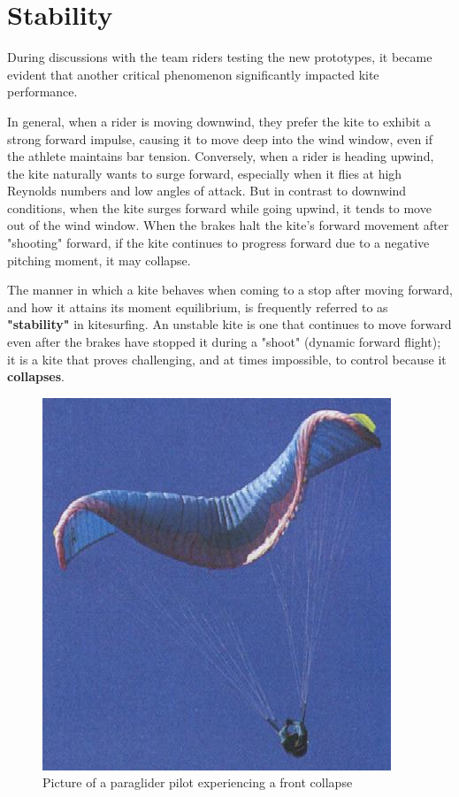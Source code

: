 
\chapter{Stability} 	%
\label{Chapter3} 		%


During discussions with the team riders testing the new prototypes, it became evident that another critical phenomenon significantly impacted kite performance. 

In general, when a rider is moving downwind, they prefer the kite to exhibit a strong forward impulse, causing it to move deep into the wind window, even if the athlete maintains bar tension. Conversely, when a rider is heading upwind, the kite naturally wants to surge forward, especially when it flies at high Reynolds numbers and low angles of attack. But in contrast to downwind conditions, when the kite surges forward while going upwind, it tends to move out of the wind window. When the brakes halt the kite's forward movement after "shooting" forward, if the kite continues to progress forward due to a negative pitching moment, it may collapse. 

The manner in which a kite behaves when coming to a stop after moving forward, and how it attains its moment equilibrium, is frequently referred to as \textbf{"stability"} in kitesurfing. An unstable kite is one that continues to move forward even after the brakes have stopped it during a "shoot" (dynamic forward flight); it is a kite that proves challenging, and at times impossible, to control because it \textbf{collapses}.







\begin{figure}[H]
    \centering
    \includegraphics[width = 0.5\linewidth]{figures/Stability/front collapse.jpg}
    \caption{Picture of a paraglider pilot experiencing a front collapse}
    \label{fig:Picture of a paraglider pilot experiencing a front collapse}
\end{figure}


